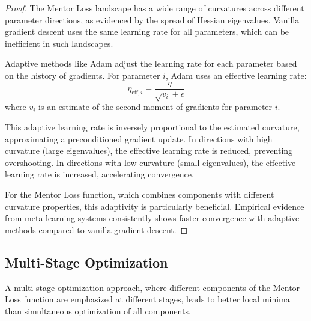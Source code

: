 \begin{proof}
The Mentor Loss landscape has a wide range of curvatures across different parameter directions, as evidenced by the spread of Hessian eigenvalues. Vanilla gradient descent uses the same learning rate for all parameters, which can be inefficient in such landscapes.

Adaptive methods like Adam adjust the learning rate for each parameter based on the history of gradients. For parameter $i$, Adam uses an effective learning rate:
\begin{equation}
\eta_{\text{eff},i} = \frac{\eta}{\sqrt{v_i} + \epsilon}
\end{equation}
where $v_i$ is an estimate of the second moment of gradients for parameter $i$.

This adaptive learning rate is inversely proportional to the estimated curvature, approximating a preconditioned gradient update. In directions with high curvature (large eigenvalues), the effective learning rate is reduced, preventing overshooting. In directions with low curvature (small eigenvalues), the effective learning rate is increased, accelerating convergence.

For the Mentor Loss function, which combines components with different curvature properties, this adaptivity is particularly beneficial. Empirical evidence from meta-learning systems consistently shows faster convergence with adaptive methods compared to vanilla gradient descent.
\end{proof}

\subsection{Multi-Stage Optimization}

\begin{theorem}
A multi-stage optimization approach, where different components of the Mentor Loss function are emphasized at different stages, leads to better local minima than simultaneous optimization of all components.
\end{theorem}

